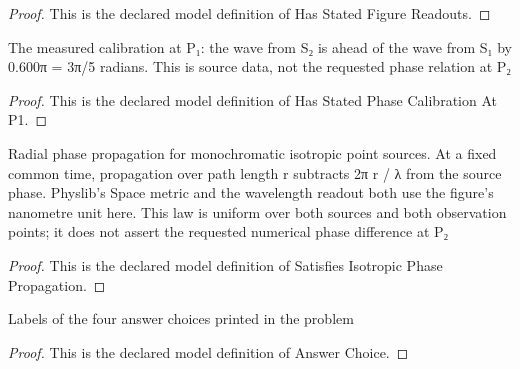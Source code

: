 \begin{proof}
  This is the declared model definition of Has Stated Figure Readouts.
\end{proof}
\begin{definition}
  \label{def:physics:phyx-mini-0087:phyxminiproblems-problemphyxmini0087-hasstatedphasecalibrationatp1}
  The measured calibration at P₁: the wave from S₂ is ahead of the wave from S₁ by 0.600π = 3π/5 radians. This is source data, not the requested phase relation at P₂
\end{definition}
\begin{proof}
  This is the declared model definition of Has Stated Phase Calibration At P1.
\end{proof}
\begin{definition}
  \label{def:physics:phyx-mini-0087:phyxminiproblems-problemphyxmini0087-satisfiesisotropicphasepropagation}
  Radial phase propagation for monochromatic isotropic point sources. At a fixed common time, propagation over path length r subtracts 2π r / λ from the source phase. Physlib's Space metric and the wavelength readout both use the figure's nanometre unit here. This law is uniform over both sources and both observation points; it does not assert the requested numerical phase difference at P₂
\end{definition}
\begin{proof}
  This is the declared model definition of Satisfies Isotropic Phase Propagation.
\end{proof}
\begin{definition}
  \label{def:physics:phyx-mini-0087:phyxminiproblems-problemphyxmini0087-answerchoice}
  Labels of the four answer choices printed in the problem
\end{definition}
\begin{proof}
  This is the declared model definition of Answer Choice.
\end{proof}
